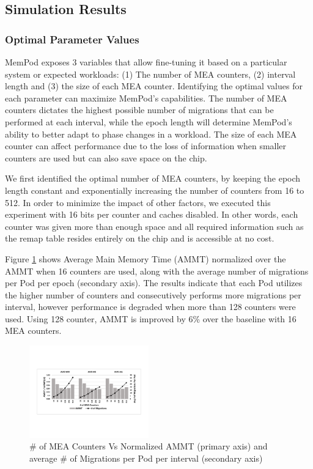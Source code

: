 \subsection{Simulation Results}
\label{sub:SimResults}

\subsubsection{Optimal Parameter Values}

MemPod exposes 3 variables that allow fine-tuning it based on a particular system or expected workloads: (1) The number of MEA counters, (2) interval length and (3) the size of each MEA counter. Identifying the optimal values for each parameter can maximize MemPod's capabilities. The number of MEA counters dictates the highest possible number of migrations that can be performed at each interval, while the epoch length will determine MemPod's ability to better adapt to phase changes in a workload. The size of each MEA counter can affect performance due to the loss of information when smaller counters are used but can also save space on the chip.

We first identified the optimal number of MEA counters, by keeping the epoch length constant and exponentially increasing the number of counters from 16 to 512. In order to minimize the impact of other factors, we executed this experiment with 16 bits per counter and caches disabled. In other words, each counter was given more than enough space and all required information such as the remap table resides entirely on the chip and is accessible at no cost. 

Figure \ref{fig:num_counters} shows Average Main Memory Time (AMMT) normalized over the AMMT when 16 counters are used, along with the average number of migrations per Pod per epoch (secondary axis). The results indicate that each Pod utilizes the higher number of counters and consecutively performs more migrations per interval, however performance is degraded when more than 128 counters were used. Using 128 counter, AMMT is improved by 6\% over the baseline with 16 MEA counters. 

\begin{figure}[h]
	\centering
  \includegraphics[width=0.46\textwidth]{figures/avg_num_counters_normalized.pdf}
  \caption{\# of MEA Counters Vs Normalized AMMT (primary axis) and average \# of Migrations per Pod per interval (secondary axis)}
  \label{fig:num_counters}
\end{figure}

